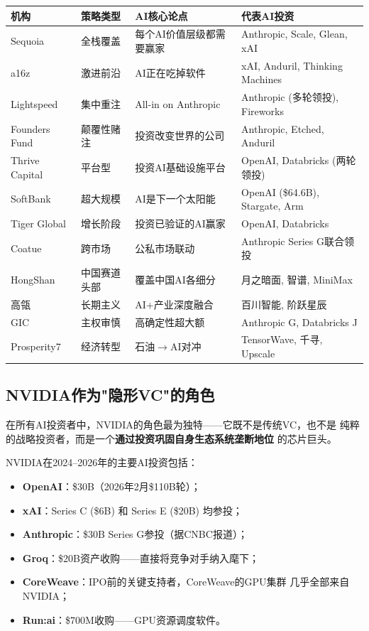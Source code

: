 \begin{keybox}[顶级AI投资机构策略对比]
\small
\begin{tabularx}{\textwidth}{l l X X}
\toprule
\rowcolor{figLightGray}
\textbf{机构} & \textbf{策略类型}
  & \textbf{AI核心论点} & \textbf{代表AI投资} \\
\midrule
Sequoia & 全栈覆盖 &
  每个AI价值层级都需要赢家 &
  Anthropic, Scale, Glean, xAI \\
a16z & 激进前沿 &
  AI正在吃掉软件 &
  xAI, Anduril, Thinking Machines \\
Lightspeed & 集中重注 &
  All-in on Anthropic &
  Anthropic (多轮领投), Fireworks \\
Founders Fund & 颠覆性赌注 &
  投资改变世界的公司 &
  Anthropic, Etched, Anduril \\
Thrive Capital & 平台型 &
  投资AI基础设施平台 &
  OpenAI, Databricks (两轮领投) \\
SoftBank & 超大规模 &
  AI是下一个太阳能 &
  OpenAI (\$64.6B), Stargate, Arm \\
Tiger Global & 增长阶段 &
  投资已验证的AI赢家 &
  OpenAI, Databricks \\
Coatue & 跨市场 &
  公私市场联动 &
  Anthropic Series G联合领投 \\
\midrule
HongShan & 中国赛道头部 &
  覆盖中国AI各细分 &
  月之暗面, 智谱, MiniMax \\
高瓴 & 长期主义 &
  AI+产业深度融合 &
  百川智能, 阶跃星辰 \\
GIC & 主权审慎 &
  高确定性超大额 &
  Anthropic G, Databricks J \\
Prosperity7 & 经济转型 &
  石油$\to$AI对冲 &
  TensorWave, 千寻, Upscale \\
\bottomrule
\end{tabularx}
\end{keybox}

\subsection{NVIDIA作为"隐形VC"的角色}
\label{subsec:fund-nvidia-vc}

在所有AI投资者中，NVIDIA的角色最为独特——它既不是传统VC，也不是
纯粹的战略投资者，而是一个\textbf{通过投资巩固自身生态系统垄断地位}
的芯片巨头。

NVIDIA在2024--2026年的主要AI投资包括：
\begin{itemize}
  \item \textbf{OpenAI}：\$30B（2026年2月\$110B轮）；
  \item \textbf{xAI}：Series C (\$6B) 和 Series E (\$20B) 均参投；
  \item \textbf{Anthropic}：\$30B Series G参投（据CNBC报道）；
  \item \textbf{Groq}：\$20B资产收购——直接将竞争对手纳入麾下；
  \item \textbf{CoreWeave}：IPO前的关键支持者，CoreWeave的GPU集群
    几乎全部来自NVIDIA；
  \item \textbf{Run:ai}：\$700M收购——GPU资源调度软件。
\end{itemize}

